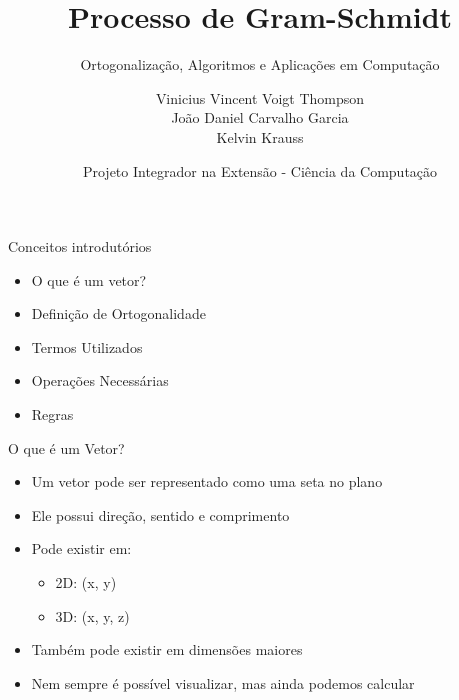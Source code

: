\documentclass{beamer}
\title{Processo de Gram-Schmidt}
\subtitle{Ortogonalização, Algoritmos e Aplicações em Computação}
\author{
Vinicius Vincent Voigt Thompson \\
João Daniel Carvalho Garcia \\
Kelvin Krauss
}
\date{Projeto Integrador na Extensão - Ciência da Computação}
\begin{document}
\frame{\titlepage}

\begin{frame}{Conceitos introdutórios}



\vspace{0.5cm}

\begin{itemize}
    \item O que é um vetor?
    \item Definição de Ortogonalidade
    \item Termos Utilizados
    \item Operações Necessárias
    \item Regras
\end{itemize}

\end{frame}
\begin{frame}{O que é um Vetor?}


\begin{itemize}
    \item Um vetor pode ser representado como uma seta no plano
    \item Ele possui direção, sentido e comprimento
    \item Pode existir em:
    \begin{itemize}
        \item 2D: (x, y)
        \item 3D: (x, y, z)
    \end{itemize}
    \item Também pode existir em dimensões maiores
    \item Nem sempre é possível visualizar, mas ainda podemos calcular
\end{itemize}

\end{frame}
\end{document}
